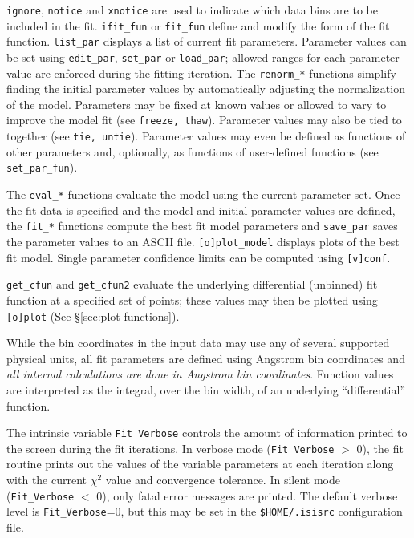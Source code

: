 \documentclass{book}
\begin{document}
{\tt ignore}, {\tt notice} and {\tt xnotice} are used to indicate
which data bins are to be included in the fit. {\tt ifit\_fun} or
{\tt fit\_fun} define and modify the form of the fit function.
{\tt list\_par} displays a list of current fit parameters.
Parameter values can be set using {\tt edit\_par}, {\tt set\_par}
or {\tt load\_par}; allowed ranges for each parameter value are
enforced during the fitting iteration. The {\tt renorm\_*}
functions simplify finding the initial parameter values by
automatically adjusting the normalization of the model. Parameters
may be fixed at known values or allowed to vary to improve the
model fit (see {\tt freeze, thaw}). Parameter values may also be
tied to together (see {\tt tie, untie}). Parameter values may even
be defined as functions of other parameters and, optionally, as
functions of user-defined functions (see \verb|set_par_fun|).

The {\tt eval\_*} functions evaluate the model using the current
parameter set. Once the fit data is specified and the model and
initial parameter values are defined, the {\tt fit\_*} functions
compute the best fit model parameters and {\tt save\_par} saves
the parameter values to an ASCII file. {\tt [o]plot\_model}
displays plots of the best fit model. Single parameter confidence
limits can be computed using {\tt [v]conf}.

{\tt get\_cfun} and {\tt get\_cfun2} evaluate the underlying
differential (unbinned) fit function at a specified set of
points; these values may then be plotted using {\tt [o]plot}
(See \S \ref{sec:plot-functions}).

While the bin coordinates in the input data may use any of several
supported physical units, all fit parameters are defined using
Angstrom bin coordinates and {\it all internal calculations are
done in Angstrom bin coordinates}.  Function values are
interpreted as the integral, over the bin width, of an underlying
``differential'' function.

The intrinsic variable {\tt Fit\_Verbose} controls the amount of
information printed to the screen during the fit iterations. In
verbose mode ({\tt Fit\_Verbose} $>$ 0), the fit routine prints out
the values of the variable parameters at each iteration along with
the current $\chi^2$ value and convergence tolerance. In silent
mode ({\tt Fit\_Verbose} $<$ 0), only fatal error messages are
printed. The default verbose level is {\tt Fit\_Verbose}=0, but
this may be set in the {\tt \$HOME/.isisrc} configuration file.
\end{document}
